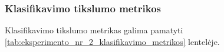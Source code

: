 \subsubsection{Klasifikavimo tikslumo metrikos}
\label{subsubsec:eksperimentas_nr_2_klasifikacijos_tikslumo_metrikos}

Klasifikavimo tikslumo metrikas galima pamatyti \ref{tab:eksperimento_nr_2_klasifikavimo_metrikos} lentelėje.

